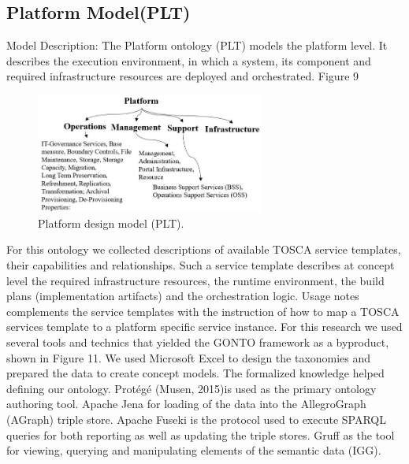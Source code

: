 \subsection{Platform Model(PLT)}
Model Description: The Platform ontology (PLT) models the platform level. It describes the execution environment, in which a system, its component and required infrastructure resources are deployed and orchestrated. Figure 9 
%
\begin{figure}[h]
  \centering
    \includegraphics[width=7.5cm]{images/Fig10-IG.Plt.Model.png }
    \caption{Platform design model (PLT).}
  \label{fig:pltmod}
\end{figure}
For this ontology we collected descriptions of available TOSCA service templates, their capabilities and relationships. Such a service template describes at concept level the required infrastructure resources, the runtime environment, the build plans (implementation artifacts) and the orchestration logic. Usage notes complements the service templates with the instruction of how to map a TOSCA services template to a platform specific service instance. 
For this research we used several tools and technics that yielded the GONTO framework as a byproduct, shown in Figure 11. We used Microsoft Excel to design the taxonomies and prepared the data to create concept models. The formalized knowledge helped defining our ontology. Protégé (Musen, 2015)is used as the primary ontology authoring tool. Apache Jena for loading of the data into the AllegroGraph (AGraph) triple store. Apache Fuseki is the protocol used to execute SPARQL queries for both reporting as well as updating the triple stores. Gruff as the tool for viewing, querying and manipulating elements of the semantic data (IGG).